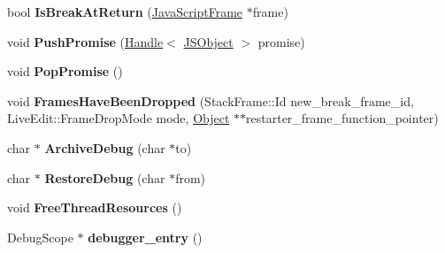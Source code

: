 \begin{DoxyCompactItemize}
\item 
\hypertarget{classv8_1_1internal_1_1_debug_af5fc31cb9511b4fcf59263b3c30ab670}{}bool {\bfseries Is\+Break\+At\+Return} (\hyperlink{classv8_1_1internal_1_1_java_script_frame}{Java\+Script\+Frame} $\ast$frame)\label{classv8_1_1internal_1_1_debug_af5fc31cb9511b4fcf59263b3c30ab670}

\item 
\hypertarget{classv8_1_1internal_1_1_debug_ae3c015a004b9355d59274664a2a49cdc}{}void {\bfseries Push\+Promise} (\hyperlink{classv8_1_1internal_1_1_handle}{Handle}$<$ \hyperlink{classv8_1_1internal_1_1_j_s_object}{J\+S\+Object} $>$ promise)\label{classv8_1_1internal_1_1_debug_ae3c015a004b9355d59274664a2a49cdc}

\item 
\hypertarget{classv8_1_1internal_1_1_debug_a7fc85e83d5c78fa1c1c607ebd5fd977c}{}void {\bfseries Pop\+Promise} ()\label{classv8_1_1internal_1_1_debug_a7fc85e83d5c78fa1c1c607ebd5fd977c}

\item 
\hypertarget{classv8_1_1internal_1_1_debug_ae77cb28107b3855bcc8463789fb0d761}{}void {\bfseries Frames\+Have\+Been\+Dropped} (Stack\+Frame\+::\+Id new\+\_\+break\+\_\+frame\+\_\+id, Live\+Edit\+::\+Frame\+Drop\+Mode mode, \hyperlink{classv8_1_1internal_1_1_object}{Object} $\ast$$\ast$restarter\+\_\+frame\+\_\+function\+\_\+pointer)\label{classv8_1_1internal_1_1_debug_ae77cb28107b3855bcc8463789fb0d761}

\item 
\hypertarget{classv8_1_1internal_1_1_debug_a728b6f78ff43400533ea5c0c5ac00f19}{}char $\ast$ {\bfseries Archive\+Debug} (char $\ast$to)\label{classv8_1_1internal_1_1_debug_a728b6f78ff43400533ea5c0c5ac00f19}

\item 
\hypertarget{classv8_1_1internal_1_1_debug_adecb3c22088fc338ea44d910ae2158aa}{}char $\ast$ {\bfseries Restore\+Debug} (char $\ast$from)\label{classv8_1_1internal_1_1_debug_adecb3c22088fc338ea44d910ae2158aa}

\item 
\hypertarget{classv8_1_1internal_1_1_debug_a85b2eb55cc26c9140c90a82c73f45da8}{}void {\bfseries Free\+Thread\+Resources} ()\label{classv8_1_1internal_1_1_debug_a85b2eb55cc26c9140c90a82c73f45da8}

\item 
\hypertarget{classv8_1_1internal_1_1_debug_a60efa0af2facab244e6179d65658fff5}{}Debug\+Scope $\ast$ {\bfseries debugger\+\_\+entry} ()\label{classv8_1_1internal_1_1_debug_a60efa0af2facab244e6179d65658fff5}


\end{DoxyCompactItemize}
